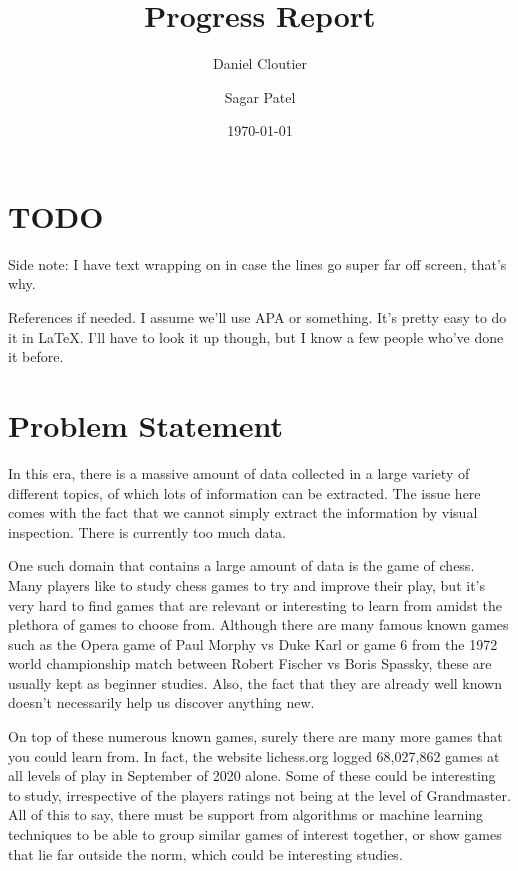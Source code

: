 \documentclass[12pt]{article}
\title{Progress Report}
\author{Daniel Cloutier \and Sagar Patel}
\date{\today}
\begin{document}
    \begin{singlespace}
        \maketitle 
    \end{singlespace}

    \section{TODO}
    Side note: I have text wrapping on in case the lines go super far off screen, that's why.

    References if needed. I assume we'll use APA or something. It's pretty easy to do it in LaTeX. I'll have to look it up though, but I know a few people who've done it before.

    \section{Problem Statement}

    In this era, there is a massive amount of data collected in a large variety of different topics, of which lots of information can be extracted. The issue here comes with the fact that we cannot simply extract the information by visual inspection. There is currently too much data. 
    
    One such domain that contains a large amount of data is the game of chess. Many players like to study chess games to try and improve their play, but it's very hard to find games that are relevant or interesting to learn from amidst the plethora of games to choose from. Although there are many famous known games such as the Opera game of Paul Morphy vs Duke Karl or game 6 from the 1972 world championship match between Robert Fischer vs Boris Spassky, these are usually kept as beginner studies. Also, the fact that they are already well known doesn't necessarily help us discover anything new. 
    
    On top of these numerous known games, surely there are many more games that you could learn from. In fact, the website lichess.org logged 68,027,862 games at all levels of play in September of 2020 alone. Some of these could be interesting to study, irrespective of the players ratings not being at the level of Grandmaster. All of this to say, there must be support from algorithms or machine learning techniques to be able to group similar games of interest together, or show games that lie far outside the norm, which could be interesting studies.
\end{document}
